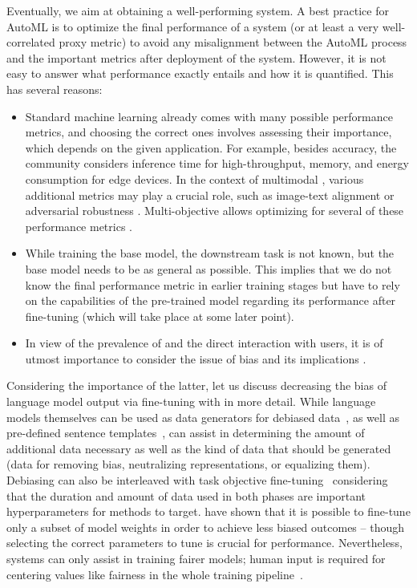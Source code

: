 Eventually, we aim at obtaining a well-performing \LLM system. A best practice for AutoML is to optimize the final performance of a system (or at least a very well-correlated proxy metric) to avoid any misalignment between the AutoML process and the important metrics after deployment of the system. However, it is not easy to answer what performance exactly entails and how it is quantified. This has several reasons: \begin{itemize}
    \item Standard machine learning already comes with many possible performance metrics, and choosing the correct ones involves assessing their importance, which depends on the given application. For example, besides accuracy, the community considers inference time for high-throughput, memory, and energy consumption for edge devices. In the context of multimodal \LLMs, various additional metrics may play a crucial role, such as image-text alignment \cite{xu-cvpr18a, grimal-arxiv2023a} or adversarial robustness \cite{zhao-neurips23a}. Multi-objective \AutoML allows optimizing for several of these performance metrics \cite{moraleshernandez-arxiv21a,karl-evolearn23a}.
    \item While training the base model, the downstream task is not known, but the base model needs to be as general as possible. This implies that we do not know the final performance metric in earlier training stages but have to rely on the capabilities of the pre-trained model regarding its performance after fine-tuning (which will take place at some later point).
    \item In view of the prevalence of \LLMs and the direct interaction with users, it is of utmost importance to consider the issue of bias and its implications \cite{kumar-etal-2023-language}.
\end{itemize}

Considering the importance of the latter, let us discuss decreasing the bias of language model output via fine-tuning with \AutoML in more detail. While language models themselves can be used as data generators for debiased data~\cite{schick-tacl21,hernandez-arxiv23}, as well as pre-defined sentence templates~\cite{liang-acl20}, \AutoML can assist in determining the amount of additional data necessary as well as the kind of data that should be generated (data for removing bias, neutralizing representations, or equalizing them). 
Debiasing can also be interleaved with task objective fine-tuning~\cite{saravanan-arxiv23} considering that the duration and amount of data used in both phases are important hyperparameters for \AutoML methods to target.
\citet{gira-ltedi22} have shown that it is possible to fine-tune only a subset of model weights in order to achieve less biased outcomes -- though selecting the correct parameters to tune is crucial for performance.
Nevertheless, \AutoML systems can only assist in training fairer models; human input is required for centering values like fairness in the whole training pipeline~\cite{bender-facct21,weerts-arxiv23a}.

